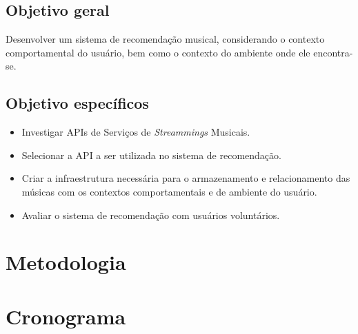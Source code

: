 \documentclass{article}
\begin{document}
\subsection{Objetivo geral}

Desenvolver um sistema de recomendação musical, considerando o contexto comportamental do usuário, bem como o contexto do ambiente onde ele encontra-se.

\subsection{Objetivo específicos}

\begin{itemize}
\item Investigar APIs de Serviços de \textit{Streammings} Musicais.

\item Selecionar a API a ser utilizada no sistema de recomendação.

\item Criar a infraestrutura necessária para o armazenamento e relacionamento das músicas com os contextos comportamentais e de ambiente do usuário.

\item Avaliar o sistema de recomendação com usuários voluntários.

\end{itemize}

\newpage

\section{Metodologia}

\newpage

\section{Cronograma}

\newpage


% 

\end{document}
